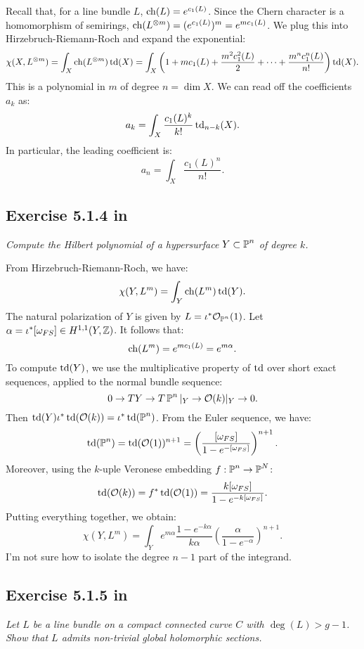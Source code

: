 \documentclass{article}
\begin{document}
Recall that, for a line bundle $L$,	$\operatorname{ch}(L) = e^{c_1(L)}$. Since the Chern character is a homomorphism of semirings,
$\operatorname{ch}(L^{\otimes m}) = (e^{c_1(L)})^m = e^{mc_1(L)}$. We plug this into Hirzebruch-Riemann-Roch and expand the exponential:
\begin{equation*}
\chi(X,L^{\otimes m}) = \int_X \operatorname{ch}(L^{\otimes m}) \operatorname{td}(X) = \int_X \left(1 + m c_1(L) + \frac{m^2c_1^2(L)}{2}
+ \dots + \frac{m^nc_1^n(L)}{n!} \right) \operatorname{td}(X)  .
\end{equation*}
This is a polynomial in $m$ of degree $n = \dim X$. We can read off the coefficients $a_k$ as:
\[		a_k = \int_X \frac{c_1(L)^k}{k!} \operatorname{td}_{n-k}(X) .	\]
In particular, the leading coefficient is:
\[	a_n = \int_X \frac{c_1(L)^n}{n!} .	\]




\subsection*{Exercise 5.1.4 in \cite{Huy}}
\emph{Compute the Hilbert polynomial of a hypersurface $Y\subset \operatorname{\mathbb{P}}^n$ of degree $k$.}
\vspace{3mm}

From Hirzebruch-Riemann-Roch, we have:
\[	\chi(Y,L^m) = \int_Y \operatorname{ch}(L^m) \operatorname{td}(Y).	\]
The natural polarization of $Y$ is given by $L = \iota^* \mathcal{O}_{\operatorname{\mathbb{P}}^n}(1)$. Let $\alpha = \iota^*[\omega_{FS}] \in
H^{1,1}(Y,\mathbb{Z})$. It follows that:
\[	\operatorname{ch}(L^m) = e^{m c_1(L)} = e^{m\alpha}.	\]
To compute $\operatorname{td}(Y)$, we use the multiplicative property of $\operatorname{td}$ over short exact sequences, applied to the normal bundle
sequence:
\[	0 \to TY \to T\operatorname{\mathbb{P}}^n|_Y \to \mathcal{O}(k)|_Y \to 0.	\]
Then $\operatorname{td}(Y) \iota^*\operatorname{td}(\mathcal{O}(k)) = \iota^* \operatorname{td}(\operatorname{\mathbb{P}}^n)$. From the Euler sequence, we have:
\[	\operatorname{td}(\operatorname{\mathbb{P}}^n) = \operatorname{td}(\mathcal{O}(1))^{n+1} = \left( \frac{[\omega_{FS}]}{1 - e^{-[\omega_{FS}]}} \right)^{n+1}.	\]
Moreover, using the $k$-uple Veronese embedding $f :\operatorname{\mathbb{P}}^n \to \operatorname{\mathbb{P}}^N$:
\[	\operatorname{td}(\mathcal{O}(k)) = f^* \operatorname{td}(\mathcal{O}(1)) = \frac{k [\omega_{FS}]}{1 - e^{-k[\omega_{FS}]}} . \]
Putting everything together, we obtain:
\[	\chi(Y,L^m) = \int_Y e^{m \alpha} \frac{1 - e^{-k\alpha}}{k \alpha} 
\left( \frac{\alpha}{1 - e^{-\alpha}} \right)^{n+1} .	\]
I'm not sure how to isolate the degree $n-1$ part of the integrand. 


\subsection*{Exercise 5.1.5 in \cite{Huy}}
\emph{Let $L$ be a line bundle on a compact connected curve $C$ with $\deg(L)>g-1$. Show that $L$ admits non-trivial global
holomorphic sections.}
\vspace{3mm}
\end{document}
